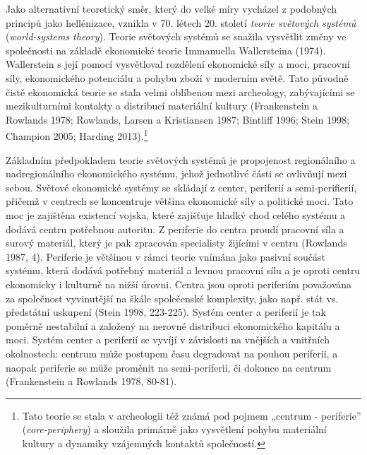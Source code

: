 Jako alternativní teoretický směr, který do velké míry vycházel z podobných principů jako hellénizace, vznikla v 70. létech 20. století {\em teorie světových systémů} ({\em world-systems theory}). Teorie světových systémů se snažila vysvětlit změny ve společnosti na základě ekonomické teorie Immanuella Wallersteina (1974). Wallerstein s její pomocí vysvětloval rozdělení ekonomické síly a moci, pracovní síly, ekonomického potenciálu a pohybu zboží v moderním světě. Tato původně čistě ekonomická teorie se stala velmi oblíbenou mezi archeology, zabývajícími se mezikulturními kontakty a distribucí materiální kultury (Frankenstein a Rowlands 1978; Rowlands, Larsen a Kristiansen 1987; Bintliff 1996; Stein 1998; Champion 2005; Harding 2013).\footnote{Tato teorie se stala v archeologii též známá pod pojmem „centrum - periferie” ({\em core-periphery}) a sloužila primárně jako vysvětlení pohybu materiální kultury a dynamiky vzájemných kontaktů společností.}

Základním předpokladem teorie světových systémů je propojenost regionálního a nadregionálního ekonomického systému, jehož jednotlivé části se ovlivňují mezi sebou. Světové ekonomické systémy se skládají z center, periferií a semi-perifierií, přičemž v centrech se koncentruje většina ekonomické síly a politické moci. Tato moc je zajištěna existencí vojska, které zajišťuje hladký chod celého systému a dodává centru potřebnou autoritu. Z periferie do centra proudí pracovní síla a surový materiál, který je pak zpracován specialisty žijícími v centru (Rowlands 1987, 4). Periferie je většinou v rámci teorie vnímána jako pasivní součást systému, která dodává potřebný materiál a levnou pracovní sílu a je oproti centru ekonomicky i kulturně na nižší úrovni. Centra jsou oproti periferiím považována za společnost vyvinutější na škále společenské komplexity, jako např. stát vs. předstátní uskupení (Stein 1998, 223-225). Systém center a periferií je tak poměrně nestabilní a založený na nerovné distribuci ekonomického kapitálu a moci. Systém center a periferií se vyvíjí v závislosti na vnějších a vnitřních okolnostech: centrum může postupem času degradovat na pouhou periferii, a naopak periferie se může proměnit na semi-periferii, či dokonce na centrum (Frankenstein a Rowlands 1978, 80-81).

